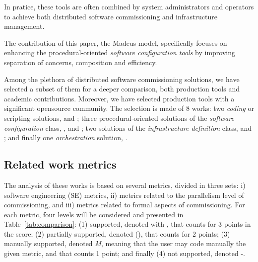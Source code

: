 In pratice, these tools are often combined by system administrators
and operators to achieve both distributed software commissioning and
infrastructure management.

\begin{tcolorbox}[enhanced,attach boxed title to top left={yshift=-3mm,yshifttext=-1mm},
  colback=black!5!white,colframe=black!30,colbacktitle=black!60,
  title=Contribution,fonttitle=\bfseries,
  boxed title style={size=small,colframe=black!60,boxrule=0.2mm},
  boxrule=0.2mm]
  The contribution of this paper, \ie the Madeus model, specifically
  focuses on enhancing the procedural-oriented \emph{software
    configuration tools} by improving separation of concerns,
  composition and efficiency.
\end{tcolorbox}

Among the plethora of distributed software commissioning solutions, we
have selected a subset of them for a deeper comparison, both production tools and
academic contributions. Moreover, we have selected production tools
with a significant opensource community.
%
The selection is made of 8 works: two \emph{coding} or scripting solutions, \shell and
\fractal; three procedural-oriented solutions of the \emph{software
  configuration} class, \ansible, \deployware and \aeolus; two
solutions of the \emph{infrastructure definition} class, \juju and
\tosca; and finally one \emph{orchestration} solution, \kubernetes. 

\subsection{Related work metrics}

The analysis of these works is based on several metrics,
divided in three sets: i) software engineering (SE) metrics, ii) metrics related to the
parallelism level of commissioning, and iii) metrics related to formal
aspects of commissioning. For each metric, four levels will be
considered and presented in Table~\ref{tab:comparison}: (1) supported,
denoted with \checkmark, that counts for 3 points in the score; (2)
partially supported, denoted (\checkmark), that counts for 2 points;
(3) manually supported, denoted \emph{M}, meaning that the user may
code manually the given metric, and that counts 1 point; and finally
(4) not supported, denoted -.

